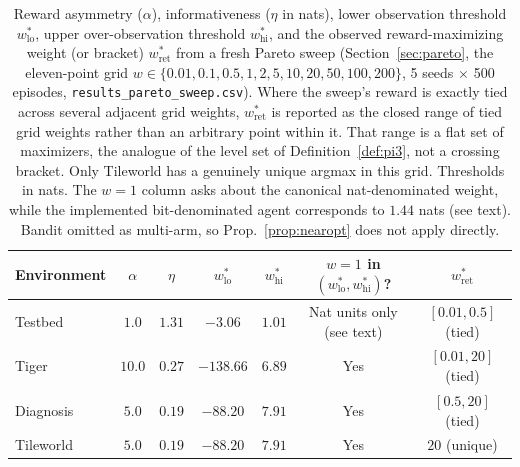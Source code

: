 \begin{table}[ht]
\centering
\caption{Reward asymmetry ($\alpha$), informativeness ($\eta$ in nats), lower observation threshold $w^*_{\mathrm{lo}}$, upper over-observation threshold $w^*_{\mathrm{hi}}$, and the observed reward-maximizing weight (or bracket) $w^*_{\mathrm{ret}}$ from a fresh Pareto sweep (Section~\ref{sec:pareto}, the eleven-point grid $w \in \{0.01, 0.1, 0.5, 1, 2, 5, 10, 20, 50, 100, 200\}$, 5 seeds $\times$ 500 episodes, \texttt{results\_\allowbreak pareto\_\allowbreak sweep.csv}). Where the sweep's reward is exactly tied across several adjacent grid weights, $w^*_{\mathrm{ret}}$ is reported as the closed range of tied grid weights rather than an arbitrary point within it. That range is a flat set of maximizers, the analogue of the level set of Definition~\ref{def:pi3}, not a crossing bracket. Only Tileworld has a genuinely unique argmax in this grid. Thresholds in nats. The $w{=}1$ column asks about the canonical nat-denominated weight, while the implemented bit-denominated agent corresponds to $1.44$ nats (see text). Bandit omitted as multi-arm, so Prop.~\ref{prop:nearopt} does not apply directly.}
\label{tab:alpha_eta}
\begin{tablebody}
\begin{tabular}{lcccccc}
\toprule
Environment & $\alpha$ & $\eta$ & $w^*_{\mathrm{lo}}$ & $w^*_{\mathrm{hi}}$ & $w{=}1$ in $(w^*_{\mathrm{lo}},w^*_{\mathrm{hi}})$? & $w^*_{\mathrm{ret}}$ \\
\midrule
Testbed & $1.0$ & $1.31$ & $-3.06$ & $1.01$ & Nat units only (see text) & $[0.01, 0.5]$ (tied) \\
Tiger & $10.0$ & $0.27$ & $-138.66$ & $6.89$ & Yes & $[0.01, 20]$ (tied) \\
Diagnosis & $5.0$ & $0.19$ & $-88.20$ & $7.91$ & Yes & $[0.5, 20]$ (tied) \\
Tileworld & $5.0$ & $0.19$ & $-88.20$ & $7.91$ & Yes & $20$ (unique) \\
\bottomrule
\end{tabular}
\end{tablebody}
\end{table}

